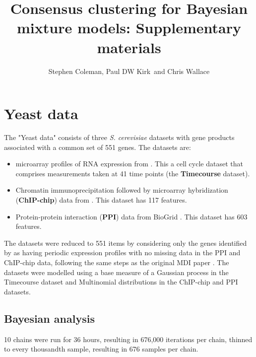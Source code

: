 \documentclass[]{article}
\title{Consensus clustering for Bayesian mixture models: Supplementary materials}
\author{Stephen Coleman, Paul DW Kirk\, and Chris Wallace}
\begin{document}
\maketitle

\begin{abstract}

\end{abstract}

\section{Yeast data}

The "Yeast data" consists of three \emph{S. cerevisiae} datasets with gene products associated with a common set of 551 genes. The datasets are:
\begin{itemize}
	\item microarray profiles of RNA expression from \cite{granovskaia2010high}. This a cell cycle dataset that comprises measurements taken at 41 time points (the \textbf{Timecourse} dataset).
	\item Chromatin immunoprecipitation followed by microarray hybridization (\textbf{ChIP-chip}) data from \cite{harbison2004transcriptional}. This dataset has 117 features.
	\item Protein-protein interaction (\textbf{PPI}) data from BioGrid \citep{stark2006biogrid}. This dataset has 603 features.
\end{itemize}
The datasets were reduced to 551 items by considering only the genes identified by \cite{granovskaia2010high} as having periodic expression profiles with no missing data in the PPI and ChIP-chip data, following the same steps as the original MDI paper \citep{kirk2012bayesian}. The datasets were modelled using a base measure of a Gaussian process in the Timecourse dataset and Multinomial distributions in the ChIP-chip and PPI datasets.

\subsection{Bayesian analysis} \label{sec:bayesianAnalysis}
10 chains were run for 36 hours, resulting in 676,000 iterations per chain, thinned to every thousandth sample, resulting in 676 samples per chain. 
\end{document}
